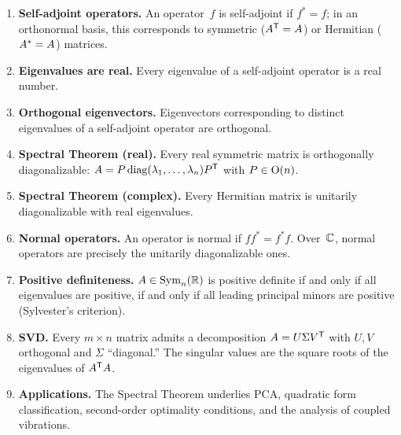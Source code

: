 \begin{enumerate}
  \item \textbf{Self-adjoint operators.}  An operator~$f$ is self-adjoint
    if $f^*=f$; in an orthonormal basis, this corresponds to symmetric
    (${A}^{\mathsf{T}}=A$) or Hermitian (${A}^{*}=A$) matrices.

  \item \textbf{Eigenvalues are real.}  Every eigenvalue of a self-adjoint
    operator is a real number.

  \item \textbf{Orthogonal eigenvectors.}  Eigenvectors corresponding to
    distinct eigenvalues of a self-adjoint operator are orthogonal.

  \item \textbf{Spectral Theorem (real).}  Every real symmetric matrix is
    orthogonally diagonalizable: $A = P\operatorname{diag}(\lambda_1,\ldots,\lambda_n){P}^{\mathsf{T}}$
    with $P\in\operatorname{O}(n)$.

  \item \textbf{Spectral Theorem (complex).}  Every Hermitian matrix is
    unitarily diagonalizable with real eigenvalues.

  \item \textbf{Normal operators.}  An operator is normal if $ff^*=f^*f$.
    Over~${\mathbb{C}}$, normal operators are precisely the unitarily
    diagonalizable ones.

  \item \textbf{Positive definiteness.}  $A\in\operatorname{Sym}_n({\mathbb{R}})$ is positive
    definite if and only if all eigenvalues are positive, if and only if
    all leading principal minors are positive (Sylvester's criterion).

  \item \textbf{SVD.}  Every $m\times n$ matrix admits a decomposition
    $A = U\Sigma{V}^{\mathsf{T}}$ with $U,V$ orthogonal and $\Sigma$
    ``diagonal.''  The singular values are the square roots of the
    eigenvalues of ${A}^{\mathsf{T}}A$.

  \item \textbf{Applications.}  The Spectral Theorem underlies PCA,
    quadratic form classification, second-order optimality conditions,
    and the analysis of coupled vibrations.
\end{enumerate}
